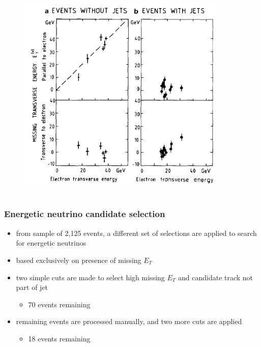 \documentclass[xcolor=table]{beamer}
\begin{document}
\begin{frame}
\begin{columns}
\begin{figure}[h]
\centering
\includegraphics[width=0.9\textwidth]{images/electron-selection-transverse-energy.png}
\end{figure}


\end{columns}

\end{frame}



\begin{frame}
\frametitle{Energetic neutrino candidate selection}
\fontsize{12pt}{12}\selectfont

\begin{itemize}
\item from sample of 2,125 events, a different set of selections are applied to search for energetic neutrinos
\item based exclusively on presence of missing $E_T$
\item two simple cuts are made to select high missing $E_T$ and candidate track not part of jet
\begin{itemize}
\item 70 events remaining
\end{itemize}
\item remaining events are processed manually, and two more cuts are applied
\begin{itemize}
\item 18 events remaining
\end{itemize}
\end{itemize}


\end{frame}
\end{document}
